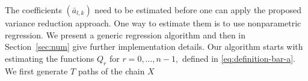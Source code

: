 \documentclass[bj]{imsart}
\def\NtrainPath{T}
\def\TrainSet{\mathcal{D}}
\newcommand*{\argmin}{\operatornamewithlimits{arg\,min}}
\begin{document}
\par
The coefficients \((\bar a_{l,k})\) need to be estimated before one can apply the proposed variance reduction approach.
One way to estimate them is to use nonparametric regression.
We present a generic regression algorithm and then in Section~\ref{sec:num} give further implementation details. Our algorithm starts with estimating the functions
$Q_r$ for $r=0,\ldots,n-1,$ defined in \eqref{eq:definition-bar-a}.
We first generate \(\NtrainPath\)  paths  of the chain \(X\)
\end{document}
